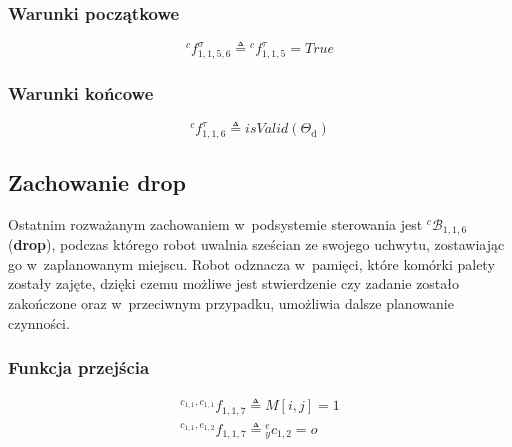 \subsubsection{Warunki początkowe}
\begin{equation}
    {}^{c}f^{\sigma}_{1,1,5,6} \triangleq {}^{c}f^{\tau}_{1,1,5} = True
\end{equation}

\subsubsection{Warunki końcowe}
\begin{equation}
    {}^{c}f^{\tau}_{1,1,6} \triangleq isValid(\Theta_{\mathrm{d}})
\end{equation}


\subsection{Zachowanie drop}
\label{subsec:cs-drop}
Ostatnim rozważanym zachowaniem w~podsystemie sterowania jest ${}^{c}\mathcal{B}_{1,1,6}$ (\textbf{drop}), podczas którego robot uwalnia sześcian ze swojego uchwytu, zostawiając go w~zaplanowanym miejscu. Robot odznacza w~pamięci, które komórki palety zostały zajęte, dzięki czemu możliwe jest stwierdzenie czy zadanie zostało zakończone oraz w~przeciwnym przypadku, umożliwia dalsze planowanie czynności.

\subsubsection{Funkcja przejścia}
\begin{equation}
    \begin{gathered}
        {}^{c_{1,1}, c_{1,1}}f_{1,1,7} \triangleq M[i,j] = 1 \\
        {}^{c_{1,1}, e_{1,2}}f_{1,1,7} \triangleq {}^{e}_{y}c_{1,2} = o
    \end{gathered}
\end{equation}

